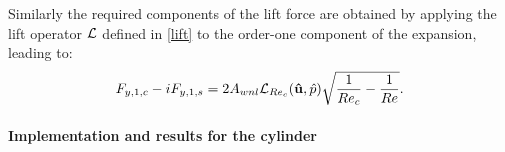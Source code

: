 \documentclass[twocolumn,10pt]{asme2ej}
\newcommand{\be}[1]{ \begin{equation} \label{#1}}
\newcommand{\ee}{\end{equation}}
\begin{document}
Similarly the required components of the lift force are obtained by applying the lift operator ${\cal L}$ defined in \eqref{lift} 
to the order-one component of the expansion, leading to:
\be{lift_cos}
F_{y,1,c} - i F_{y,1,s} = 2 A_{wnl} {\cal{L}}_{Re_c}( {\bf \hat{u}},\hat{p} ) \sqrt{\frac{1}{Re_c}-\frac{1}{Re}}.
\ee





\paragraph{Implementation and results for the cylinder}
\end{document}
